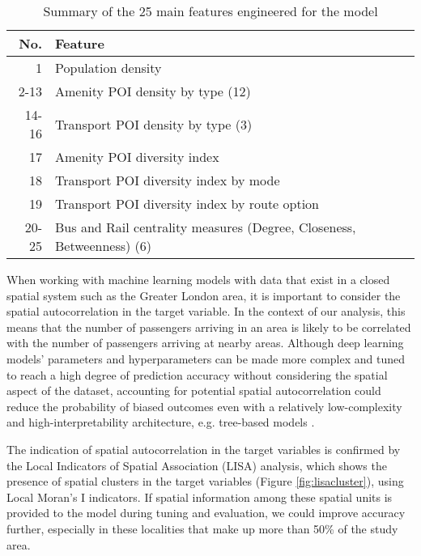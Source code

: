 \begin{table}[!ht]
    \centering
    \renewcommand{\arraystretch}{1.25}
    \begin{tabular}{|r||l|}
        \hline
        \rowcolor{lightgray}
        \textbf{No.} & \textbf{Feature} \\
        \hline
        1 & Population density \\
        2-13 & Amenity POI density by type (12) \\
        14-16 & Transport POI density by type (3) \\
        17 & Amenity POI diversity index \\
        18 & Transport POI diversity index by mode \\
        19 & Transport POI diversity index by route option \\
        20-25 & Bus and Rail centrality measures (Degree, Closeness, Betweenness) (6) \\
        \hline
    \end{tabular}
    \caption{Summary of the 25 main features engineered for the model}
    \label{tab:features}
\end{table}

When working with machine learning models with data that exist in a closed spatial system such as the Greater London area, it is important to consider the spatial autocorrelation in the target variable. In the context of our analysis, this means that the number of passengers arriving in an area is likely to be correlated with the number of passengers arriving at nearby areas. Although deep learning models' parameters and hyperparameters can be made more complex and tuned to reach a high degree of prediction accuracy without considering the spatial aspect of the dataset, accounting for potential spatial autocorrelation could reduce the probability of biased outcomes even with a relatively low-complexity and high-interpretability architecture, e.g. tree-based models \citep{meyerImportanceSpatialPredictor2019}.

The indication of spatial autocorrelation in the target variables is confirmed by the Local Indicators of Spatial Association (LISA) analysis, which shows the presence of spatial clusters in the target variables (Figure \ref{fig:lisacluster}), using Local Moran's I indicators. If spatial information among these spatial units is provided to the model during tuning and evaluation, we could improve accuracy further, especially in these localities that make up more than 50\% of the study area.  

